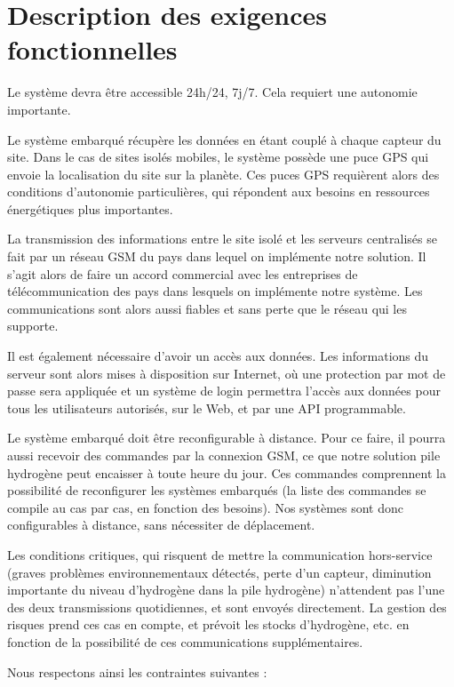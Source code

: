 \section{Description des exigences fonctionnelles}

Le système devra être accessible 24h/24, 7j/7. Cela requiert une autonomie importante.

Le système embarqué récupère les données en étant couplé à chaque capteur du site. Dans le cas de sites isolés mobiles, le système possède une puce GPS qui envoie la localisation du site sur la planète. Ces puces GPS requièrent alors des conditions d’autonomie particulières, qui répondent aux besoins en ressources énergétiques plus importantes.

La transmission des informations entre le site isolé et les serveurs centralisés se fait par un réseau GSM du pays dans lequel on implémente notre solution. Il s’agit alors de faire un accord commercial avec les entreprises de télécommunication des pays dans lesquels on implémente notre système. Les communications sont alors aussi fiables et sans perte que le réseau qui les supporte.

Il est également nécessaire d’avoir un accès aux données. Les informations du serveur sont alors mises à disposition sur Internet, où une protection par mot de passe sera appliquée et un système de login permettra l’accès aux données pour tous les utilisateurs autorisés, sur le Web, et par une API programmable.

Le système embarqué doit être reconfigurable à distance. Pour ce faire, il pourra aussi recevoir des commandes par la connexion GSM, ce que notre solution pile hydrogène peut encaisser à toute heure du jour. Ces commandes comprennent la possibilité de reconfigurer les systèmes embarqués (la liste des commandes se compile au cas par cas, en fonction des besoins). Nos systèmes sont donc configurables à distance, sans nécessiter de déplacement.

Les conditions critiques, qui risquent de mettre la communication hors-service (graves problèmes environnementaux détectés, perte d’un capteur, diminution importante du niveau d’hydrogène dans la pile hydrogène) n’attendent pas l’une des deux transmissions quotidiennes, et sont envoyés directement. La gestion des risques prend ces cas en compte, et prévoit les stocks d’hydrogène, etc. en fonction de la possibilité de ces communications supplémentaires.

Nous respectons ainsi les contraintes suivantes :

